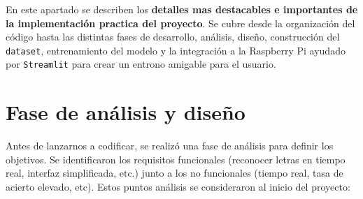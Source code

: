 
En este apartado se describen los \textbf{detalles mas destacables e importantes de la implementación practica del proyecto}. Se cubre desde la organización del código hasta las distintas fases de desarrollo, análisis, diseño, construcción del \texttt{dataset}, entrenamiento del modelo y la integración a la Raspberry Pi ayudado por \texttt{Streamlit} para crear un entrono amigable para el usuario.


\section{Fase de análisis y diseño}

Antes de lanzarnos a codificar, se realizó una fase de análisis para definir los objetivos. Se identificaron los requisitos funcionales (reconocer letras en tiempo real, interfaz simplificada, etc.) junto a los no funcionales (tiempo real, tasa de acierto elevado, etc). Estos puntos análisis se consideraron al inicio del proyecto:


